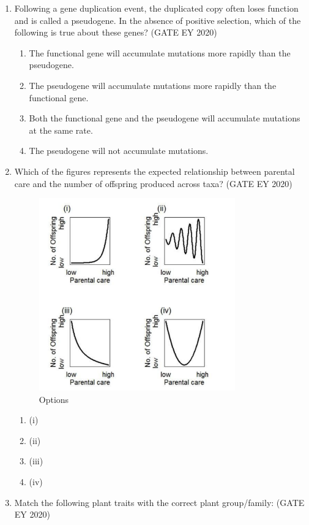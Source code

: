 \begin{enumerate}
\item
Following a gene duplication event, the duplicated copy often loses function and is called a pseudogene. In the absence of positive selection, which of the following is true about these genes? \hfill {(GATE EY 2020)}
\begin{multicols}{2}
\begin{enumerate}
\item The functional gene will accumulate mutations more rapidly than the pseudogene.
\item The pseudogene will accumulate mutations more rapidly than the functional gene.
\item Both the functional gene and the pseudogene will accumulate mutations at the same rate.
\item The pseudogene will not accumulate mutations.
\end{enumerate}
\end{multicols}

\item
Which of the figures represents the expected relationship between parental care and the number of offspring produced across taxa? \hfill {(GATE EY 2020)}

\begin{figure}[H]
\centering
    \includegraphics[width=0.8\textwidth]{figs/fig14.png}
\caption{Options}
\label{fig:q48}
\end{figure}

\begin{multicols}{2}
\begin{enumerate}
\item (i)
\item (ii)
\item (iii)
\item (iv)
\end{enumerate}
\end{multicols}
\item
Match the following plant traits with the correct plant group/family: \hfill {(GATE EY 2020)}



\end{enumerate}
